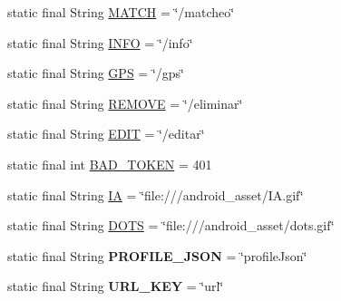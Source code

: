 \begin{DoxyCompactItemize}
\item 
static final String \hyperlink{classcom_1_1example_1_1sebastian_1_1tindertp_1_1commonTools_1_1Common_a28fde071b3faf6ab868ef469ed66cb70}{M\+A\+T\+CH} = \char`\"{}/matcheo\char`\"{}
\item 
static final String \hyperlink{classcom_1_1example_1_1sebastian_1_1tindertp_1_1commonTools_1_1Common_a415909b836ea7079008f081e482ad1a5}{I\+N\+FO} = \char`\"{}/info\char`\"{}
\item 
static final String \hyperlink{classcom_1_1example_1_1sebastian_1_1tindertp_1_1commonTools_1_1Common_a6b409e03c3a58eeff3ba5f7001b7f17d}{G\+PS} = \char`\"{}/gps\char`\"{}
\item 
static final String \hyperlink{classcom_1_1example_1_1sebastian_1_1tindertp_1_1commonTools_1_1Common_aae0c3e1d895c90e3e6daf8346012200f}{R\+E\+M\+O\+VE} = \char`\"{}/eliminar\char`\"{}
\item 
static final String \hyperlink{classcom_1_1example_1_1sebastian_1_1tindertp_1_1commonTools_1_1Common_a55102a3c9815bdf347b4d124d0e52a76}{E\+D\+IT} = \char`\"{}/editar\char`\"{}
\item 
static final int \hyperlink{classcom_1_1example_1_1sebastian_1_1tindertp_1_1commonTools_1_1Common_aac099fbe1b836e332648cde2b141203e}{B\+A\+D\+\_\+\+T\+O\+K\+EN} = 401
\item 
static final String \hyperlink{classcom_1_1example_1_1sebastian_1_1tindertp_1_1commonTools_1_1Common_aae5ecea5aa3915aa216f04a10f1d6074}{IA} = \char`\"{}file\+:///android\+\_\+asset/I\+A.\+gif\char`\"{}
\item 
static final String \hyperlink{classcom_1_1example_1_1sebastian_1_1tindertp_1_1commonTools_1_1Common_af9ff2dd415fc9361e082cf3877c8c635}{D\+O\+TS} = \char`\"{}file\+:///android\+\_\+asset/dots.\+gif\char`\"{}
\item 
static final String {\bfseries P\+R\+O\+F\+I\+L\+E\+\_\+\+J\+S\+ON} = \char`\"{}profile\+Json\char`\"{}\hypertarget{classcom_1_1example_1_1sebastian_1_1tindertp_1_1commonTools_1_1Common_a2d70e4f1b3e6b5876072315847f46fcb}{}\label{classcom_1_1example_1_1sebastian_1_1tindertp_1_1commonTools_1_1Common_a2d70e4f1b3e6b5876072315847f46fcb}

\item 
static final String {\bfseries U\+R\+L\+\_\+\+K\+EY} = \char`\"{}url\char`\"{}\hypertarget{classcom_1_1example_1_1sebastian_1_1tindertp_1_1commonTools_1_1Common_a55021db0efa3887ab7fb69950534c8da}{}\label{classcom_1_1example_1_1sebastian_1_1tindertp_1_1commonTools_1_1Common_a55021db0efa3887ab7fb69950534c8da}


\end{DoxyCompactItemize}
